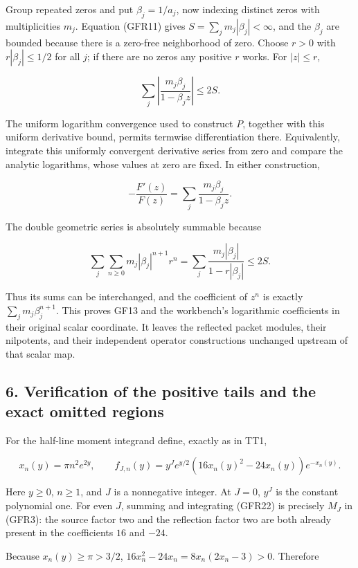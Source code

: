 Group repeated zeros and put \(\beta_j=1/a_j\), now indexing distinct zeros with multiplicities \(m_j\). Equation (GFR11) gives \(S=\sum_jm_j|\beta_j|<\infty\), and the \(\beta_j\) are bounded because there is a zero-free neighborhood of zero. Choose \(r>0\) with \(r|\beta_j|\le1/2\) for all \(j\); if there are no zeros any positive \(r\) works. For \(|z|\le r\),

\[
\sum_j\left|\frac{m_j\beta_j}{1-\beta_jz}\right|\le2S.
\tag{GFR20}
\]

The uniform logarithm convergence used to construct \(P\), together with this uniform derivative bound, permits termwise differentiation there. Equivalently, integrate this uniformly convergent derivative series from zero and compare the analytic logarithms, whose values at zero are fixed. In either construction,

\[
-\frac{F'(z)}{F(z)}=
\sum_j\frac{m_j\beta_j}{1-\beta_jz}.
\]

The double geometric series is absolutely summable because

\[
\sum_j\sum_{n\ge0}m_j|\beta_j|^{n+1}r^n
=\sum_j\frac{m_j|\beta_j|}{1-r|\beta_j|}\le2S.
\tag{GFR21}
\]

Thus its sums can be interchanged, and the coefficient of \(z^n\) is exactly \(\sum_jm_j\beta_j^{n+1}\). This proves GF13 and the workbench's logarithmic coefficients in their original scalar coordinate. It leaves the reflected packet modules, their nilpotents, and their independent operator constructions unchanged upstream of that scalar map.

\subsection{6. Verification of the positive tails and the exact omitted regions}\label{C47stage:GFR:verification-of-the-positive-tails-and-the-exact-omitted-regions}

For the half-line moment integrand define, exactly as in TT1,

\[
x_n(y)=\pi n^2e^{2y},\qquad
f_{J,n}(y)=y^Je^{y/2}(16x_n(y)^2-24x_n(y))e^{-x_n(y)}.
\tag{GFR22}
\]

Here \(y\ge0\), \(n\ge1\), and \(J\) is a nonnegative integer. At \(J=0\), \(y^J\) is the constant polynomial one. For even \(J\), summing and integrating (GFR22) is precisely \(M_J\) in (GFR3): the source factor two and the reflection factor two are both already present in the coefficients \(16\) and \(-24\).

Because \(x_n(y)\ge\pi>3/2\), \(16x_n^2-24x_n=8x_n(2x_n-3)>0\). Therefore

